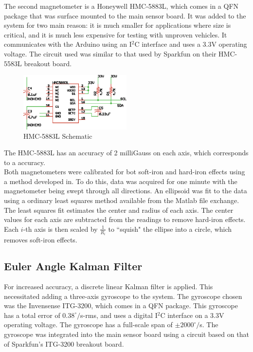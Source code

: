  The second magnetometer is a Honeywell HMC-5883L, which comes in a QFN package that was surface mounted to the main sensor board. It was added to the system for two main reason: it is much smaller for applications where size is critical, and it is much less expensive for testing with unproven vehicles. It communicates with the Arduino using an I$^2$C interface and uses a 3.3V operating voltage\cite{hmc5883LDatasheet}. The circuit used was similar to that used by Sparkfun on their HMC-5583L breakout board\cite{hmc5883LSchematic}.
 
 \begin{figure}[h!]
   \caption{HMC-5883L Schematic} \label{hmc5883LSchematic}
   \centering
     \includegraphics[width=0.5\textwidth]{figures/hmc5883LSchematic.eps}
 \end{figure}
 
 The HMC-5883L has an accuracy of 2 milliGauss on each axis, which corresponds to a accuracy.\\

 Both magnetometers were calibrated for bot soft-iron and hard-iron effects using a method developed in. 
 To do this, data was acquired for one minute with the magnetometer being swept through all directions. An ellipsoid was fit to the data using a ordinary least squares method available from the Matlab file exchange.
 The least squares fit estimates the center and radius of each axis. The center values for each axis are subtracted from the readings to remove hard-iron effects. Each $i$-th axis is then scaled by $\frac{1}{R_i}$ to ``squish" the ellipse into a circle, which removes soft-iron effects.
\subsection*{Euler Angle Kalman Filter}
For increased accuracy, a discrete linear Kalman filter is applied. This necessitated adding a three-axis gyroscope to the system. The gyroscope chosen was the Invensense ITG-3200, which comes in a QFN package. This gyroscope has a total error of $0.38^\circ/$s-rms\cite{itg3200DataSheet}, and uses a digital I$^2$C interface on a 3.3V operating voltage. The gyroscope has a full-scale span of $\pm2000^\circ/$s. The gyroscope was integrated into the main sensor board using a circuit based on that of Sparkfun's ITG-3200 breakout board\cite{itg3200BOBSchematic}.

